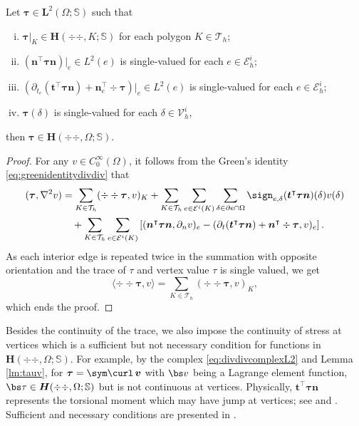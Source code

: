 \begin{lemma}\label{lem:Hdivdivpatching}
Let $\boldsymbol \tau\in \boldsymbol  L^2(\Omega;\mathbb S)$ such that
\begin{enumerate}[(i)]
\item $\boldsymbol \tau|_K\in \boldsymbol{H}(\div{\div},K; \mathbb{S})$ for each polygon $K\in\mathcal T_h$;

\smallskip
\item $(\boldsymbol  n^{\intercal}\boldsymbol \tau\boldsymbol  n)|_e\in L^2(e)$ is single-valued for each $e\in\mathcal E_h^i$;

\smallskip
\item $(\partial_{t_e}(\boldsymbol  t^{\intercal}\boldsymbol \tau\boldsymbol  n)+\boldsymbol  n_e^{\intercal}\div\boldsymbol \tau)|_e\in L^2(e)$ is single-valued for each $e\in\mathcal E_h^i$;

\smallskip
\item $\boldsymbol \tau(\delta)$ is single-valued for each $\delta\in\mathcal V_h^i$,
\end{enumerate}
then $\boldsymbol \tau\in \boldsymbol{H}(\div{\div},\Omega; \mathbb{S})$.
\end{lemma}
\begin{proof}
For any $v\in C_0^{\infty}(\Omega)$, it follows from the Green's identity \eqref{eq:greenidentitydivdiv} that
\begin{align*}
(\boldsymbol \tau, \nabla^2v)&=\sum_{K\in\mathcal T_h}(\div\div\boldsymbol \tau, v)_K+\sum_{K\in\mathcal T_h}\sum_{e\in\mathcal E^i(K)}\sum_{\delta\in\partial e\cap\Omega}\sign_{e,\delta}(\boldsymbol  t^{\intercal}\boldsymbol \tau\boldsymbol  n)(\delta)v(\delta)\\
&\quad+\sum_{K\in\mathcal T_h}\sum_{e\in\mathcal E^i(K)}\left[(\boldsymbol  n^{\intercal}\boldsymbol \tau\boldsymbol  n, \partial_n v)_{e}-(\partial_{t}(\boldsymbol  t^{\intercal}\boldsymbol \tau\boldsymbol  n)+\boldsymbol  n^{\intercal}\div\boldsymbol \tau,  v)_{e}\right].
\end{align*}
As each interior edge is repeated twice in the summation with opposite orientation and the trace of $\tau$ and vertex value $\tau$ is single valued, we get
\[
\langle\div\div\boldsymbol \tau, v\rangle=\sum_{K\in\mathcal T_h}(\div \div\boldsymbol \tau, v)_K,
\]
which ends the proof.
\end{proof}
Besides the continuity of the trace, we also impose the continuity of stress at vertices which is a sufficient but not necessary condition for functions in $\boldsymbol{H}(\div{\div },\Omega; \mathbb{S})$. For example, by the complex \eqref{eq:divdivcomplexL2} and Lemma \ref{lm:tauv}, for $\boldsymbol  \tau = \sym \curl \, \boldsymbol  v$ with $\bs v$ being a Lagrange element function, $\bs \tau\in \boldsymbol{H}(\div{\div },\Omega; \mathbb{S})$ but is not continuous at vertices. Physically, $\boldsymbol  t^{\intercal}\boldsymbol \tau\boldsymbol  n$ represents the torsional moment which may have jump at vertices; see \cite[\S 3.4]{FengShi1996} and \cite[\S 3.4]{HuangShiXu2005}. {Sufficient and necessary conditions are presented in \cite[Proposition 3.6]{Fuhrer;Heuer;Niemi:2019ultraweak}.}

